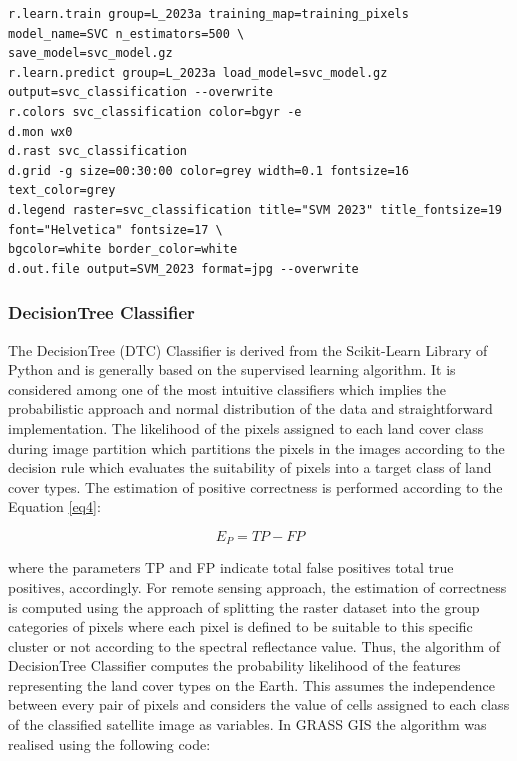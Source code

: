 \documentclass{elektr}
\begin{document}
\begin{footnotesize}
\begin{verbatim}
r.learn.train group=L_2023a training_map=training_pixels model_name=SVC n_estimators=500 \
save_model=svc_model.gz 
r.learn.predict group=L_2023a load_model=svc_model.gz output=svc_classification --overwrite
r.colors svc_classification color=bgyr -e
d.mon wx0
d.rast svc_classification
d.grid -g size=00:30:00 color=grey width=0.1 fontsize=16 text_color=grey
d.legend raster=svc_classification title="SVM 2023" title_fontsize=19 font="Helvetica" fontsize=17 \
bgcolor=white border_color=white
d.out.file output=SVM_2023 format=jpg --overwrite
\end{verbatim}
\end{footnotesize}

\subsubsection{DecisionTree Classifier}

The DecisionTree (DTC) Classifier is derived from the Scikit-Learn Library of Python and is generally based on the supervised learning algorithm. It is considered among one of the most intuitive classifiers which implies the probabilistic approach and normal distribution of the data and straightforward implementation. The likelihood of the pixels assigned to each land cover class during image partition which partitions the pixels in the images according to the decision rule which evaluates the suitability of pixels into a target class of land cover types. The estimation of positive correctness is performed according to the Equation \ref{eq4}:

\begin{equation}
E_P=TP - FP
\label{eq4}
\end{equation}

where the parameters TP and FP indicate total false positives total true positives, accordingly. For remote sensing approach, the estimation of correctness is computed using the approach of splitting the raster dataset into the group categories of pixels where each pixel is defined to be suitable to this specific cluster or not according to the spectral reflectance value. Thus, the algorithm of DecisionTree Classifier computes the probability likelihood of the features representing the land cover types on the Earth. This assumes the independence between every pair of pixels and considers the value of cells assigned to each class of the classified satellite image as variables. In GRASS GIS the algorithm was realised using the following code:
\end{document}
